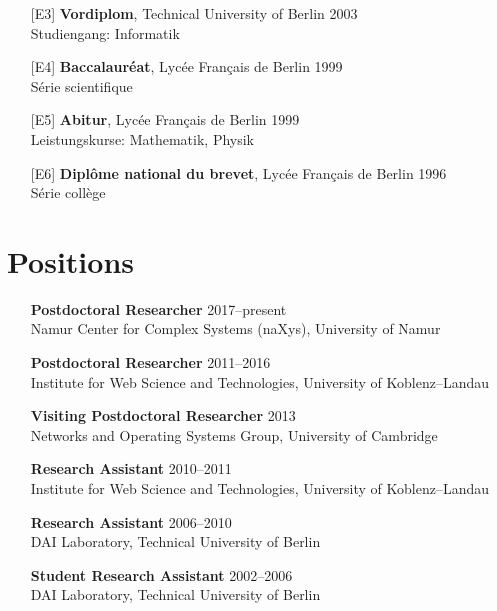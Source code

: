 \documentclass[line,mm]{res}
\newcounter{x}
\newcounter{y}
\begin{document}
\begin{resume}
\begin{itemize}
\item[{[E3]}]
\textbf{Vordiplom}, Technical University of Berlin \hfill 2003 \\
Studiengang:  Informatik

\item[{[E4]}]
\textbf{Baccalauréat}, Lycée Français de Berlin \hfill 1999 \\
Série scientifique

\item[{[E5]}]
\textbf{Abitur}, Lycée Français de Berlin \hfill 1999 \\
Leistungskurse:  Mathematik, Physik 

\item[{[E6]}]
\textbf{Diplôme national du brevet}, Lycée Français de Berlin \hfill 1996 \\
Série collège

\end{itemize}

\section{Positions}

\begin{itemize}

\item[]
\textbf{Postdoctoral Researcher} \hfill 2017--present \\
Namur Center for Complex Systems (naXys), University of Namur 

\item[]
\textbf{Postdoctoral Researcher} \hfill 2011--2016 \\
Institute for Web Science and Technologies, University of Koblenz--Landau 

\item[]
\textbf{Visiting Postdoctoral Researcher} \hfill 2013 \\
Networks and Operating Systems Group, University of Cambridge

\item[]
\textbf{Research Assistant} \hfill 2010--2011 \\
Institute for Web Science and Technologies, University of Koblenz--Landau 

\item[]
\textbf{Research Assistant} \hfill 2006--2010 \\
DAI Laboratory, Technical University of Berlin 

\item[]
\textbf{Student Research Assistant} \hfill 2002--2006 \\
DAI Laboratory, Technical University of Berlin 


\end{itemize}
\end{resume}
\end{document}
